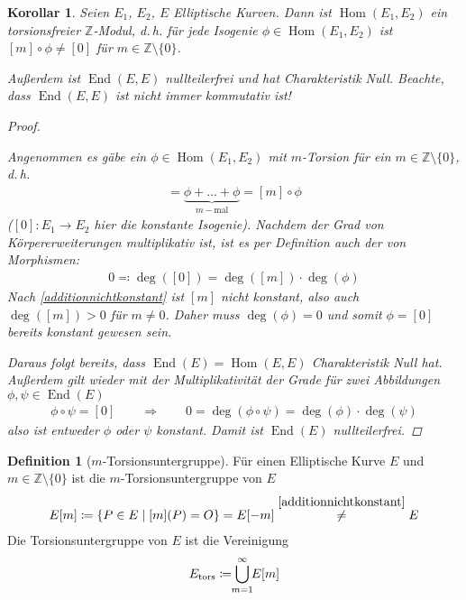 \documentclass[english, german, parskip=half]{scrartcl}
\newtheorem{Korollar}[Satz]{Korollar}
\theoremstyle{definition}
\newtheorem{Definition}[Satz]{Definition}
\theoremstyle{remark}
\newcommand*{\Z}{\mathds{Z}}
\renewcommand{\O}{O}
\DeclareMathOperator{\Hom}{Hom} %
\DeclareMathOperator{\End}{End} %
\begin{document}
\begin{Korollar}
  Seien $E_1$, $E_2$, $E$ Elliptische Kurven. Dann ist $\Hom(E_1,E_2)$
  ein torsionsfreier $\Z$-Modul, d.\,h. für jede Isogenie
  $\phi\in\Hom(E_1,E_2)$ ist $[m]\circ\phi\neq[0]$ für
  $m\in\Z\setminus\{0\}$.

  Außerdem ist $\End(E,E)$ nullteilerfrei und hat Charakteristik Null.
  Beachte, dass $\End(E,E)$ ist nicht immer kommutativ ist!
  \begin{proof}
    \cite[siehe][Proposition 4.2 (b)]{silverman}
    
    Angenommen es gäbe ein $\phi\in\Hom(E_1,E_2)$ mit $m$-Torsion für
    ein $m\in\Z\setminus\{0\}$, d.\,h. 
    \begin{gather*}
      [0]
      =\underbrace{\phi+\dotsc+\phi}_{m-\text{mal}}
      = [m]\circ\phi
    \end{gather*}
    ($[0]\colon E_1\to E_2$ hier die konstante Isogenie).
    Nachdem der Grad von Körpererweiterungen multiplikativ ist, ist es
    per Definition auch der von Morphismen:
    \begin{gather*}
      0 \eqqcolon \deg([0]) = \deg([m])\cdot\deg(\phi)
    \end{gather*}
    Nach \autoref{additionnichtkonstant} ist $[m]$ nicht konstant,
    also auch $\deg([m])>0$ für $m\neq0$. Daher muss $\deg(\phi)=0$
    und somit $\phi=[0]$ bereits konstant gewesen sein.

    Daraus folgt bereits, dass $\End(E)=\Hom(E,E)$ Charakteristik Null hat.
    Außerdem gilt wieder mit der Multiplikativität der Grade für zwei
    Abbildungen $\phi,\psi\in\End(E)$
    \begin{gather*}
      \phi\circ\psi=[0]
      \qquad\Longrightarrow\qquad
      0 = \deg(\phi\circ\psi) = \deg(\phi)\cdot\deg(\psi)
    \end{gather*}
    also ist entweder $\phi$ oder $\psi$ konstant.
    Damit ist $\End(E)$ nullteilerfrei.
  \end{proof}
\end{Korollar}

\begin{Definition}[$m$-Torsionsuntergruppe]
  Für einen Elliptische Kurve $E$ und $m\in{\Z\setminus\{0\}}$ ist die
  $m$-Torsionsuntergruppe von $E$
  \begin{gather*}
    E[m] \coloneqq \left\{ P\in E\;\middle|\; [m](P)=\O\right\}
    = E[-m]
    \overset{\autoref{additionnichtkonstant}}{\neq}E
  \end{gather*}
  Die Torsionsuntergruppe von $E$ ist die Vereinigung
  \begin{gather*}
    E_\text{tors} \coloneqq \bigcup_{\mathclap{m=1}}^{\infty}E[m]
  \end{gather*}
\end{Definition}
\end{document}
